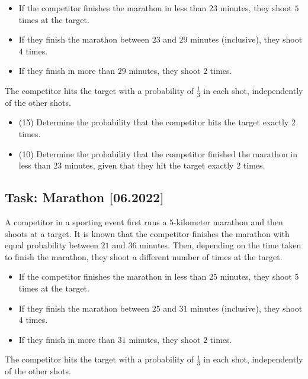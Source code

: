 \documentclass[a4paper, 12pt]{article}
\begin{document}
\begin{itemize}
    \item If the competitor finishes the marathon in less than $23$ minutes, they shoot $5$ times at the target.

\item If they finish the marathon between $23$ and $29$ minutes (inclusive), they shoot $4$ times.

\item If they finish in more than $29$ minutes, they shoot $2$ times.
\end{itemize}

The competitor hits the target with a probability of $\frac{1}{3}$ in each shot, independently of the other shots.

\begin{itemize}
    \item [a)] (15) Determine the probability that the competitor hits the target exactly $2$ times.
    \item [b)] (10) Determine the probability that the competitor finished the marathon in less than $23$ minutes, given that they hit the target exactly $2$ times.
\end{itemize}


\subsection*{Task: Marathon [06.2022]}

A competitor in a sporting event first runs a $5$-kilometer marathon and then shoots at a target. It is known that the competitor finishes the marathon with equal probability between $21$ and $36$ minutes. Then, depending on the time taken to finish the marathon, they shoot a different number of times at the target.

\begin{itemize}
    \item If the competitor finishes the marathon in less than $25$ minutes, they shoot $5$ times at the target.

    \item If they finish the marathon between $25$ and $31$ minutes (inclusive), they shoot $4$ times.

    \item If they finish in more than $31$ minutes, they shoot $2$ times.
\end{itemize}

The competitor hits the target with a probability of $\frac{1}{3}$ in each shot, independently of the other shots.
\end{document}
